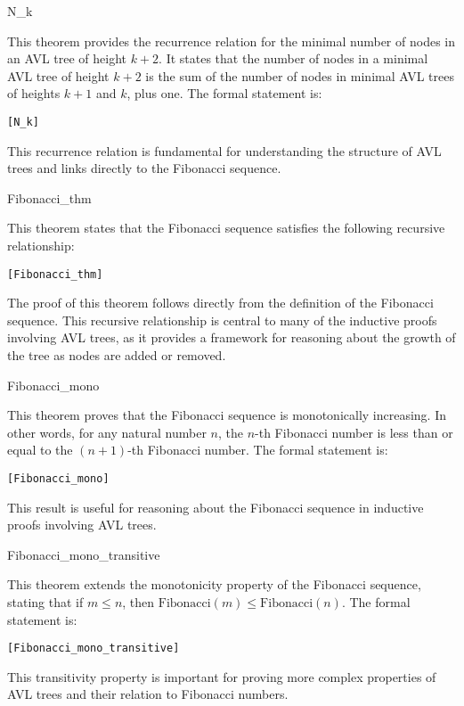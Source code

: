     \begin{thm}{N\_k}

    This theorem provides the recurrence relation for the minimal number of nodes in an AVL tree of height \( k+2 \). It states that the number of nodes in a minimal AVL tree of height \( k+2 \) is the sum of the number of nodes in minimal AVL trees of heights \( k+1 \) and \( k \), plus one. The formal statement is:

    
    \begin{alltt}
    	[N_k]
    \end{alltt}
    
    \end{thm}
    This recurrence relation is fundamental for understanding the structure of AVL trees and links directly to the Fibonacci sequence.


    \begin{thm}{Fibonacci\_thm}

    This theorem states that the Fibonacci sequence satisfies the following recursive relationship:
     \begin{alltt}
     	[Fibonacci_thm]
     \end{alltt}
     
    \end{thm}
    The proof of this theorem follows directly from the definition of the Fibonacci sequence. This recursive relationship is central to many of the inductive proofs involving AVL trees, as it provides a framework for reasoning about the growth of the tree as nodes are added or removed.


    \begin{thm}{Fibonacci\_mono}

    This theorem proves that the Fibonacci sequence is monotonically increasing. In other words, for any natural number \( n \), the \( n \)-th Fibonacci number is less than or equal to the \( (n+1) \)-th Fibonacci number. The formal statement is:

    \begin{alltt}
    	[Fibonacci_mono]
    \end{alltt}
    
    \end{thm}
    This result is useful for reasoning about the Fibonacci sequence in inductive proofs involving AVL trees.


    \begin{thm}{Fibonacci\_mono\_transitive}

    This theorem extends the monotonicity property of the Fibonacci sequence, stating that if \( m \leq n \), then \( \text{Fibonacci}(m) \leq \text{Fibonacci}(n) \). The formal statement is:
    
    \begin{alltt}
    	[Fibonacci_mono_transitive]
    \end{alltt}
    
    \end{thm}
    This transitivity property is important for proving more complex properties of AVL trees and their relation to Fibonacci numbers.


